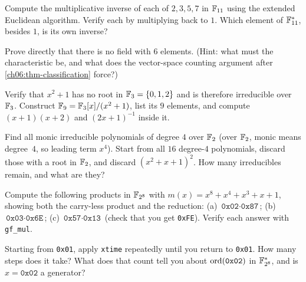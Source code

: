 \begin{exercise}[Inverses in $\F_{11}$]
\label{ch06:ex-inv11}
Compute the multiplicative inverse of each of $2,3,5,7$ in $\F_{11}$ using
the extended Euclidean algorithm. Verify each by multiplying back to $1$.
Which element of $\mathbb{F}_{11}^{*}$, besides $1$, is its own inverse?
\end{exercise}

\begin{exercise}
\label{ch06:ex-no6}
Prove directly that there is no field with $6$ elements. (Hint: what must the
characteristic be, and what does the vector-space counting argument after
\autoref{ch06:thm-classification} force?)
\end{exercise}

\begin{exercise}[Build $\F_9$]
\label{ch06:ex-f9}
Verify that $x^2+1$ has no root in $\mathbb{F}_3 = \{0,1,2\}$ and is therefore
irreducible over $\mathbb{F}_3$. Construct $\mathbb{F}_9 = \mathbb{F}_3[x]/(x^2+1)$, list its $9$
elements, and compute $(x+1)(x+2)$ and $(2x+1)^{-1}$ inside it.
\end{exercise}

\begin{exercise}
\label{ch06:ex-irred}
Find all monic irreducible polynomials of degree $4$ over $\mathbb{F}_2$ (over $\mathbb{F}_2$,
monic means degree~$4$, so leading term $x^4$). Start from all $16$ degree-$4$
polynomials, discard those with a root in $\mathbb{F}_2$, and discard
$(x^2+x+1)^2$. How many irreducibles remain, and what are they?
\end{exercise}

\begin{exercise}
\label{ch06:ex-aesmul}
Compute the following products in $\mathbb{F}_{2^8}$ with $m(x)=x^8+x^4+x^3+x+1$,
showing both the carry-less product and the reduction:
(a) $\texttt{0x02}\cdot\texttt{0x87}$;\quad
(b) $\texttt{0x03}\cdot\texttt{0x6E}$;\quad
(c) $\texttt{0x57}\cdot\texttt{0x13}$ (check that you get \texttt{0xFE}).
Verify each answer with \texttt{gf\_mul}.
\end{exercise}

\begin{exercise}
\label{ch06:ex-xtimechain}
Starting from \texttt{0x01}, apply \texttt{xtime} repeatedly until you return
to \texttt{0x01}. How many steps does it take? What does that count tell you
about $\operatorname{ord}(\texttt{0x02})$ in $\mathbb{F}_{2^8}^{*}$, and is $x = \texttt{0x02}$ a
generator?
\end{exercise}

